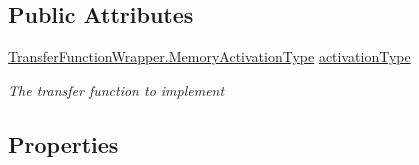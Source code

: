 \subsection*{Public Attributes}
\begin{DoxyCompactItemize}
\item 
\hyperlink{class_n_n_gen_1_1_transfer_function_wrapper_aa338ffadb8fcdf76df75419374a51ff6}{Transfer\+Function\+Wrapper.\+Memory\+Activation\+Type} \hyperlink{class_n_n_gen_1_1_sync_transfer_function_mem_a98b2591ff8d7243cfc7546a7c37032d7}{activation\+Type}
\begin{DoxyCompactList}\small\item\em The transfer function to implement \end{DoxyCompactList}\end{DoxyCompactItemize}
\subsection*{Properties}
